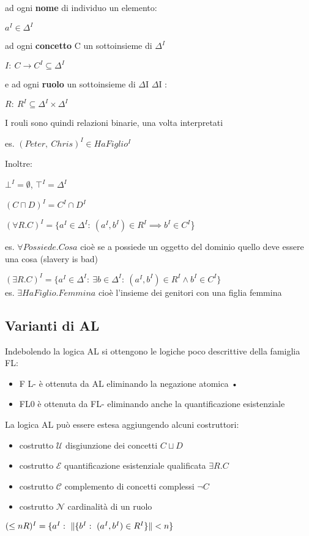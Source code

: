ad ogni \textbf{nome} di individuo un elemento: 

$a^{I}\in\Delta^{I}$

ad ogni \textbf{concetto} C un sottoinsieme di $\Delta^{I}$

$I:\ C\rightarrow C^{I}\subseteq\Delta^{I}$

e ad ogni \textbf{ruolo} un sottoinsieme di $\Delta$I \texttimes{}
$\Delta$I :

$R:\ R^{I}\subseteq\Delta^{I}\times\Delta^{I}$

I rouli sono quindi relazioni binarie, una volta interpretati

es. $(Peter,\ Chris)^{I}\in HaFiglio^{I}$

		

Inoltre:

$\bot^{I}=\emptyset$, $\top^{I}=\Delta^{I}$

$(C\sqcap D)^{I}=C^{I}\cap D^{I}$

$(\forall R.C)^{I}=\{a^{I}\in\Delta^{I}:\ (a^{I},b^{I})\in R^{I}\implies b^{I}\in C^{I}$\} 

es. $\forall Possiede.Cosa$ cioè se a possiede un oggetto del dominio
quello deve essere una cosa (slavery is bad)

$(\exists R.C)^{I}=\{a^{I}\in\Delta^{I}:\ \exists b\in\Delta^{I}:\ (a^{I},b^{I})\in R^{I}\wedge b^{I}\in C^{I}\}$\\


es. $\exists HaFiglio.Femmina$ cioè l'insieme dei genitori con una
figlia femmina\\



\subsection{Varianti di AL}

Indebolendo la logica AL si ottengono le logiche poco descrittive
della famiglia FL:
\begin{itemize}
\item F L- è ottenuta da AL eliminando la negazione atomica •
\item FL0 è ottenuta da FL- eliminando anche la quantificazione esistenziale
\end{itemize}
La logica AL può essere estesa aggiungendo alcuni costruttori: 
\begin{itemize}
\item costrutto $\mathcal{U}$ disgiunzione dei concetti $C\sqcup D$
\item costrutto $\mathcal{E}$ quantificazione esistenziale qualificata
$\exists R.C$
\item costrutto $\mathcal{C}$ complemento di concetti complessi $\neg C$
\item costrutto $\mathcal{N}$ cardinalità di un ruolo 
\end{itemize}
$(\leq nR)^{I}=\{a^{I}:\ \cardinal{\{b^{I}:\ (a^{I},b^{I})\in R^{I}\}}<n\}$

